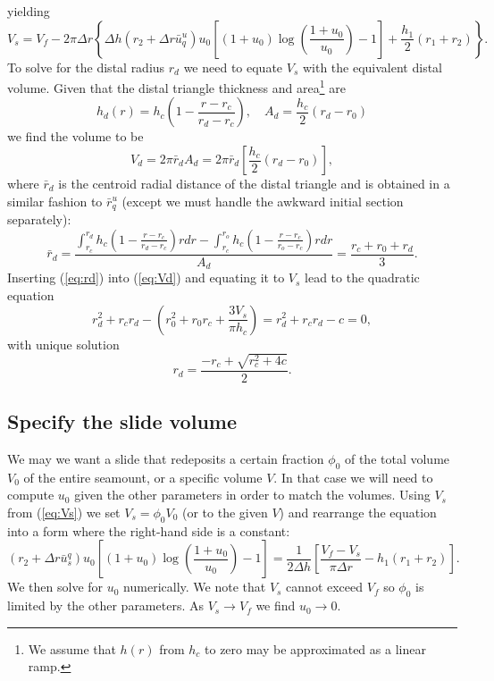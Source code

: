 \documentclass[12pt,letterpaper,margin=0.5in]{report}
\begin{document}
yielding
\begin{equation}
V_s = V_f - 2 \pi \Delta r \left \{ \Delta h \left ( r_2 + \Delta r\bar{u}_q^u \right ) u_0 \left [ (1 + u_0) \log \left (\frac{1 + u_0}{u_0} \right ) - 1 \right ] + \frac{h_1}{2} (r_1 + r_2) \right \}.
\label{eq:Vs}
\end{equation}
To solve for the distal radius $r_d$ we need to equate $V_s$ with the equivalent distal volume.
Given that the distal triangle thickness and area\footnote{We assume that $h(r)$ from $h_c$ to zero may be approximated as a linear ramp.} are
\begin{equation}
h_d(r) = h_c \left (1 - \frac{r - r_c}{r_d - r_c}\right ), \quad A_d = \frac{h_c}{2} (r_d - r_0)
\end{equation}
we find the volume to be
\begin{equation}
V_d = 2 \pi \bar{r}_d A_d = 2 \pi \bar{r}_d \left [ \frac{h_c}{2} (r_d - r_0) \right ],
\label{eq:Vd}
\end{equation}
where $\bar{r}_d$ is the centroid radial distance of the distal triangle and is obtained in a similar fashion to $\bar{r}_q^u$ (except
we must handle the awkward initial section separately):
\begin{equation}
\bar{r}_d = \frac{\int_{r_c}^{r_d}h_c \left (1 - \frac{r - r_c}{r_d - r_c} \right )rdr - \int_{r_c}^{r_o}h_c \left (1 - \frac{r - r_c}{r_o- r_c} \right )rdr}{A_d} = \frac{r_c + r_0 + r_d}{3}.
\label{eq:rd}
\end{equation}
Inserting (\ref{eq:rd}) into (\ref{eq:Vd}) and equating it to $V_s$ lead to the quadratic equation
\begin{equation}
r_d^2 + r_c r_d - \left (r_0^2 + r_0 r_c + \frac{3 V_s}{\pi h_c}\right ) = r_d^2 + r_c r_d - c = 0,
\end{equation}
with unique solution
\begin{equation}
r_d = \frac{-r_c + \sqrt{r_c^2 + 4c}}{2}.
\end{equation}

\subsection{Specify the slide volume}

We may we want a slide that redeposits a certain fraction $\phi_0$ of the total volume $V_0$ of the entire seamount, or
a specific volume $V$. In that case we will need to compute $u_0$ given the other parameters in order to match the volumes.  Using
$V_s$ from (\ref{eq:Vs}) we set $V_s = \phi_0 V_0$ (or to the given $V$) and rearrange the equation into a form where the right-hand side is a constant:
\begin{equation}
\left ( r_2 + \Delta r \bar{u}_s^q \right ) u_0 \left [ (1 + u_0) \log \left (\frac{1 + u_0}{u_0} \right ) - 1 \right ] = \frac{1}{2\Delta h} \left [\frac{V_f - V_s}{\pi \Delta r} - h_1(r_1 + r_2) \right ].
\label{eq:u0}
\end{equation}
We then solve for $u_0$ numerically.  We note that $V_s$ cannot exceed $V_f$ so $\phi_0$ is limited by the other parameters.  As
$V_s \rightarrow V_f$ we find $u_0 \rightarrow 0$.
\end{document}
